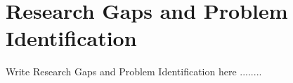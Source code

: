 \section{Research Gaps and Problem Identification}
Write Research Gaps and Problem Identification here ........
